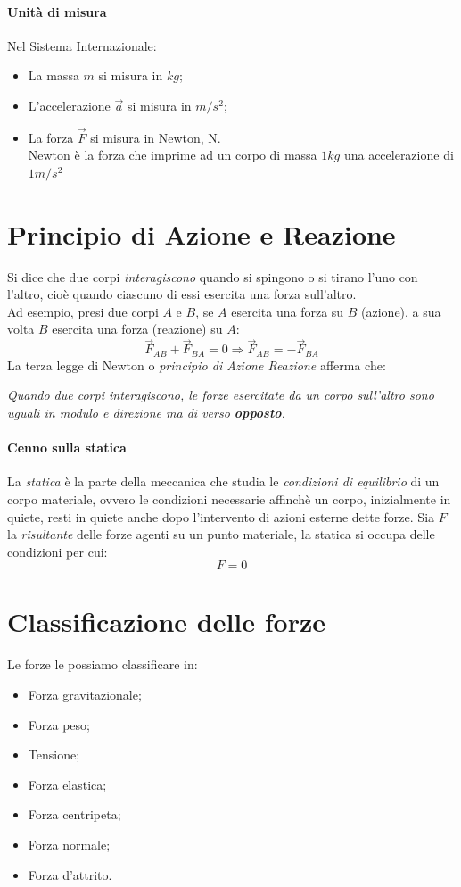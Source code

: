 \documentclass[12pt]{report}
\begin{document}
	\paragraph{Unità di misura}
	Nel Sistema Internazionale:
	\begin{itemize}
		\item La massa $m$ si misura in $kg$;
		\item L'accelerazione $\vec{a}$ si misura in $m/s^2$;
		\item La forza $\vec{F}$ si misura in Newton, N. \\
		Newton è la forza che imprime ad un corpo di massa $1kg$ una accelerazione di $1m/s^2$
	\end{itemize}
	\section{Principio di Azione e Reazione}
	Si dice che due corpi \textit{interagiscono} quando si spingono o si tirano l'uno con l'altro, cioè quando ciascuno di essi esercita una forza sull'altro. \\
	Ad esempio, presi due corpi $A$ e $B$, se $A$ esercita una forza su $B$ (azione), a sua volta $B$ esercita una forza (reazione) su $A$:
	\[
	\vec{F}_{AB} + \vec{F}_{BA} = 0 \Rightarrow \vec{F}_{AB} = -\vec{F}_{BA}
	\]
	La terza legge di Newton o \textit{principio di Azione Reazione} afferma che:
	\begin{center}
		\textit{Quando due corpi interagiscono, le forze esercitate da un corpo sull'altro sono uguali in modulo e direzione ma di verso \textbf{opposto}.}
	\end{center}
	\paragraph{Cenno sulla statica}
	La \textit{statica} è la parte della meccanica che studia le \textit{condizioni di equilibrio} di un corpo materiale, ovvero le condizioni necessarie affinchè un corpo, inizialmente in quiete, resti in quiete anche dopo l'intervento di azioni esterne dette forze. Sia $F$ la \textit{risultante} delle forze agenti su un punto materiale, la statica si occupa delle condizioni per cui:
	\[
	F = 0
	\]
	\section{Classificazione delle forze}
	Le forze le possiamo classificare in:
	\begin{itemize}
		\item Forza gravitazionale;
		\item Forza peso;
		\item Tensione;
		\item Forza elastica;
		\item Forza centripeta;
		\item Forza normale;
		\item Forza d'attrito.
	\end{itemize}
\end{document}
